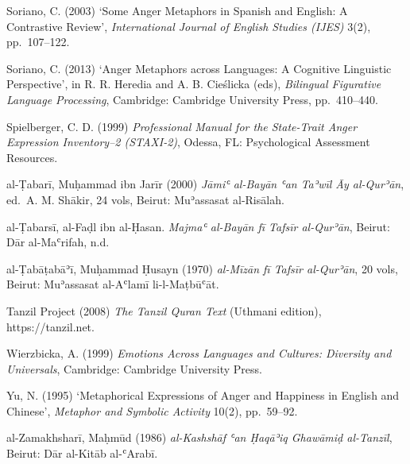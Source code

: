 Soriano, C. (2003) `Some Anger Metaphors in Spanish and English: A
Contrastive Review', \emph{International Journal of English Studies
(IJES)} 3(2), pp.~107--122.

Soriano, C. (2013) `Anger Metaphors across Languages: A Cognitive
Linguistic Perspective', in R. R. Heredia and A. B. Cieślicka (eds),
\emph{Bilingual Figurative Language Processing}, Cambridge: Cambridge
University Press, pp.~410--440.

Spielberger, C. D. (1999) \emph{Professional Manual for the State-Trait
Anger Expression Inventory--2 (STAXI-2)}, Odessa, FL: Psychological
Assessment Resources.

al-Ṭabarī, Muḥammad ibn Jarīr (2000) \emph{Jāmiʿ al-Bayān ʿan Taʾwīl Āy
al-Qurʾān}, ed.~A. M. Shākir, 24 vols, Beirut: Muʾassasat al-Risālah.

al-Ṭabarsī, al-Faḍl ibn al-Ḥasan. \emph{Majmaʿ al-Bayān fī Tafsīr
al-Qurʾān}, Beirut: Dār al-Maʿrifah, n.d.

al-Ṭabāṭabāʾī, Muḥammad Ḥusayn (1970) \emph{al-Mīzān fī Tafsīr
al-Qurʾān}, 20 vols, Beirut: Muʾassasat al-Aʿlamī li-l-Maṭbūʿāt.

Tanzil Project (2008) \emph{The Tanzil Quran Text} (Uthmani edition),
https://tanzil.net.

Wierzbicka, A. (1999) \emph{Emotions Across Languages and Cultures:
Diversity and Universals}, Cambridge: Cambridge University Press.

Yu, N. (1995) `Metaphorical Expressions of Anger and Happiness in
English and Chinese', \emph{Metaphor and Symbolic Activity} 10(2),
pp.~59--92.

al-Zamakhsharī, Maḥmūd (1986) \emph{al-Kashshāf ʿan Ḥaqāʾiq Ghawāmiḍ
al-Tanzīl}, Beirut: Dār al-Kitāb al-ʿArabī.
